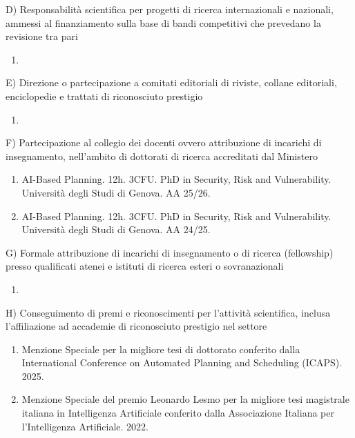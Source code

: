 \documentclass{resume} %
\begin{document}
\begin{rSectionLower}{D) Responsabilità scientifica per progetti di ricerca internazionali e nazionali, ammessi al finanziamento sulla base di bandi competitivi che prevedano la revisione tra pari}
	\begin{enumerate}
		\item 
	\end{enumerate}
\end{rSectionLower}

\begin{rSectionLower}{E) Direzione o partecipazione a comitati editoriali di riviste, collane editoriali, enciclopedie e trattati di riconosciuto prestigio}
	\begin{enumerate}
		\item 
	\end{enumerate}
\end{rSectionLower}

\begin{rSectionLower}{F) Partecipazione al collegio dei docenti ovvero attribuzione di incarichi di insegnamento, nell'ambito di dottorati di ricerca accreditati dal Ministero}
	\begin{enumerate}
		\item AI-Based Planning. 12h. 3CFU. PhD in Security, Risk and Vulnerability. Università degli Studi di Genova. AA 25/26.
		\item AI-Based Planning. 12h. 3CFU. PhD in Security, Risk and Vulnerability. Università degli Studi di Genova. AA 24/25.
	\end{enumerate}
\end{rSectionLower}

\begin{rSectionLower}{G) Formale attribuzione di incarichi di insegnamento o di ricerca (fellowship) presso qualificati atenei e istituti di ricerca esteri o sovranazionali}
	\begin{enumerate}
		\item 
	\end{enumerate}
\end{rSectionLower}

\break
\begin{rSectionLower}{H) Conseguimento di premi e riconoscimenti per l'attività scientifica, inclusa l’affiliazione ad accademie di riconosciuto prestigio nel settore}
	\begin{enumerate}
		\item Menzione Speciale per la migliore tesi di dottorato conferito dalla International Conference on Automated Planning and Scheduling (ICAPS). 2025.
		\item Menzione Speciale del premio Leonardo Lesmo per la migliore tesi magistrale italiana in Intelligenza Artificiale conferito dalla Associazione Italiana per l'Intelligenza Artificiale. 2022.
	\end{enumerate}
\end{rSectionLower}
\end{document}
